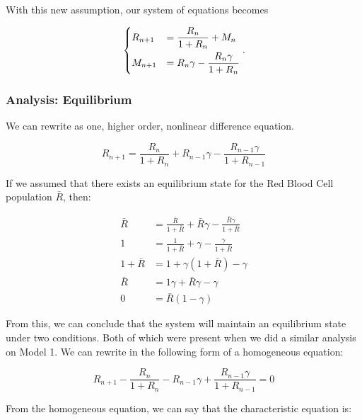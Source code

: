 With this new assumption, our system of equations becomes

\begin{equation}
    \begin{dcases}
        R_{n+1} &= \frac{R_n}{1 + R_n} + M_n\\
        M_{n+1} &= R_n\gamma-\frac{R_n\gamma}{1+R_n}
    \end{dcases}.
    \label{eq:nonlinear-difference-model-system}
\end{equation}

\subsubsection{Analysis: Equilibrium}

We can rewrite  as one, higher order, nonlinear difference equation.

\begin{equation}
    R_{n+1} = \frac{R_n}{1 + R_n} + R_{n-1}\gamma-\frac{R_{n-1}\gamma}{1+R_{n-1}}
    \label{eq:nonlinear-difference-model-equation}
\end{equation}

If we assumed that there exists an equilibrium state for the Red Blood Cell population $\bar{R}$, then:

\begin{align*}
     \bar{R} &= \frac{\bar{R}}{1 + \bar{R}} + \bar{R}\gamma - \frac{\bar{R}\gamma}{1+\bar{R}}\\
     1 &= \frac{1}{1 + \bar{R}} + \gamma - \frac{\gamma}{1+\bar{R}}\\
     1 + \bar{R} &= 1 + \gamma(1 + \bar{R}) - \gamma\\
     \bar{R} &= 1\gamma + \bar{R}\gamma - \gamma\\
     0 &= \bar{R}(1-\gamma)
\end{align*}

From this, we can conclude that the system will maintain an equilibrium state under two conditions. Both of which were present when we did a similar analysis on Model 1. We can rewrite  in the following form of a homogeneous equation:

\begin{equation*}
    R_{n+1} - \frac{R_n}{1 + R_n} - R_{n-1}\gamma + \frac{R_{n-1}\gamma}{1+R_{n-1}} = 0
\end{equation*}

From the homogeneous equation, we can say that the characteristic equation is:

